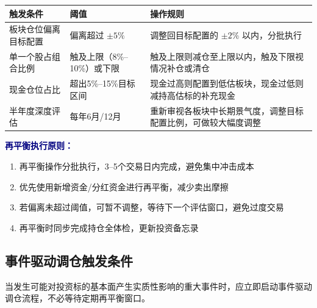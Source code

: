 \begin{exhibitbox}[表9-14：定期再平衡触发条件与操作规则]
\scriptsize
\setlength{\tabcolsep}{3pt}
\renewcommand{\arraystretch}{1.15}
\begin{tabularx}{\textwidth}{l l X}
\toprule
\textbf{触发条件} & \textbf{阈值} & \textbf{操作规则} \\
\midrule
板块仓位偏离目标配置 & 偏离超过 $\pm 5\%$ & 调整回目标配置的 $\pm 2\%$ 以内，分批执行 \\
单一个股占组合比例 & 触及上限（8\%--10\%）或下限 & 触及上限则减仓至上限以内，触及下限视情况补仓或清仓 \\
现金仓位占比 & 超出5\%--15\%目标区间 & 现金过高则配置到低估板块，现金过低则减持高估标的补充现金 \\
半年度深度评估 & 每年6月/12月 & 重新审视各板块中长期景气度，调整目标配置比例，可做较大幅度调整 \\
\bottomrule
\end{tabularx}
\vspace{0.3cm}
\textcolor{navy}{\textbf{再平衡执行原则：}}
\begin{enumerate}[leftmargin=1.8em, font=\scriptsize]
\item \scriptsize 再平衡操作分批执行，3--5个交易日内完成，避免集中冲击成本
\item \scriptsize 优先使用新增资金/分红资金进行再平衡，减少卖出摩擦
\item \scriptsize 若偏离未超过阈值，可暂不调整，等待下一个评估窗口，避免过度交易
\item \scriptsize 再平衡时同步完成持仓全体检，更新投资备忘录
\end{enumerate}
\end{exhibitbox}

\subsection{事件驱动调仓触发条件}

当发生可能对投资标的基本面产生实质性影响的重大事件时，应立即启动事件驱动调仓流程，不必等待定期再平衡窗口。

